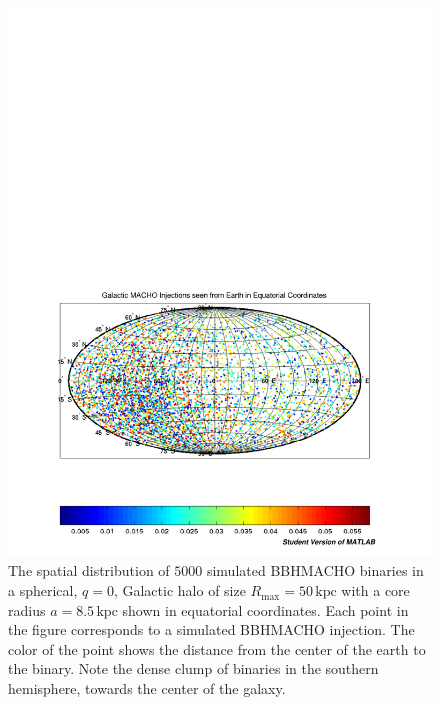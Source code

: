 \begin{figure}[p]
\begin{center}
\includegraphics[width=\linewidth]{figures/macho/spherical_equatorial}
\end{center}
\caption{\label{f:spherical_equatorial}%
The spatial distribution of $5000$ simulated BBHMACHO binaries in a spherical,
$q=0$, Galactic halo of size $R_\mathrm{max} = 50\,\mathrm{kpc}$ with a core
radius $a = 8.5\,\mathrm{kpc}$ shown in equatorial coordinates. Each point
in the figure corresponds to a simulated BBHMACHO injection. The color of the
point shows the distance from the center of the earth to the binary. Note the
dense clump of binaries in the southern hemisphere, towards the center of the
galaxy.
}
\end{figure}




